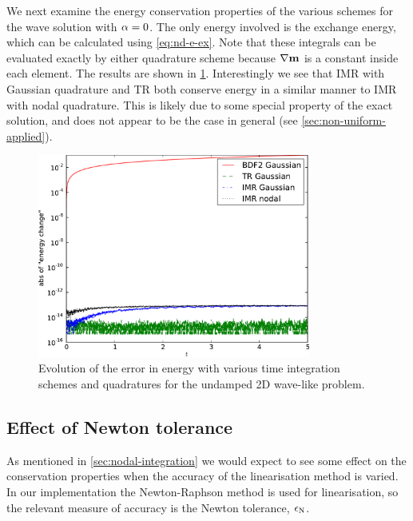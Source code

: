 We next examine the energy conservation properties of the various schemes for the wave solution with $\alpha = 0$.
The only energy involved is the exchange energy, which can be calculated using \cref{eq:nd-e-ex}.
Note that these integrals can be evaluated exactly by either quadrature scheme because $\nabla \boldsymbol{\mathrm{m}}$ is a constant inside each element.
The results are shown in \cref{fig:energy-error-2d}.
Interestingly we see that IMR with Gaussian quadrature and TR both conserve energy in a similar manner to IMR with nodal quadrature.
This is likely due to some special property of the exact solution, and does not appear to be the case in general (see \cref{sec:non-uniform-applied}).
\begin{figure}
  \centering
  \includegraphics[width=0.8\textwidth]{plots/2d_wave_solution_energy/absofenergychangevstimes}
  \caption{Evolution of the error in energy with various time integration schemes and quadratures for the undamped 2D wave-like problem.
}
  \label{fig:energy-error-2d}
\end{figure}


\subsection{Effect of Newton tolerance}
\label{sec:effect-newt-toler-m-conservation}

As mentioned in \cref{sec:nodal-integration} we would expect to see some effect on the conservation properties when the accuracy of the linearisation method is varied.
In our implementation the Newton-Raphson method is used for linearisation, so the relevant measure of accuracy is the Newton tolerance, $\epsilon_{\mathrm{N}}$.

